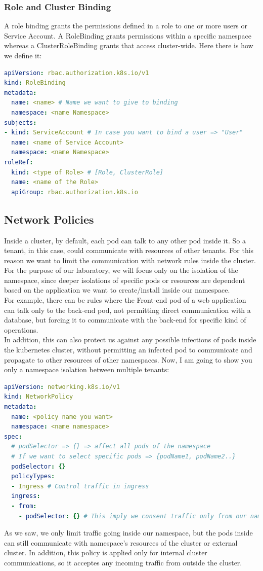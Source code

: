 \subsubsection{Role and Cluster Binding}
A role binding grants the permissions defined in a role to one or more users or Service Account. A RoleBinding grants permissions within a specific namespace whereas a ClusterRoleBinding grants that access cluster-wide. Here there is how we define it:
\begin{lstlisting}[language=yaml, caption={RoleBinding creation}]
apiVersion: rbac.authorization.k8s.io/v1
kind: RoleBinding
metadata:
  name: <name> # Name we want to give to binding
  namespace: <name Namespace>
subjects:
- kind: ServiceAccount # In case you want to bind a user => "User"
  name: <name of Service Account>
  namespace: <name Namespace>
roleRef:
  kind: <type of Role> # [Role, ClusterRole]
  name: <name of the Role>
  apiGroup: rbac.authorization.k8s.io
\end{lstlisting}


\subsection{Network Policies}
\label{subsec:network policies}
Inside a cluster, by default, each pod can talk to any other pod inside it. So a tenant, in this case, could communicate with resources of other tenants. For this reason we want to limit the communication with network rules inside the cluster. For the purpose of our laboratory, we will focus only on the isolation of the namespace, since deeper isolations of specific pods or resources are dependent based on the application we want to create/install inside our namespace. \\
For example, there can be rules where the Front-end pod of a web application can talk only to the back-end pod, not permitting direct communication with a database, but forcing it to communicate with the back-end for specific kind of operations. \\
In addition, this can also protect us against any possible infections of pods inside the kubernetes cluster, without permitting an infected pod to communicate and propagate to other resources of other namespaces. Now, I am going to show you only a namespace isolation between multiple tenants:
\begin{lstlisting}[language=yaml, caption={Network policy setup}]
apiVersion: networking.k8s.io/v1
kind: NetworkPolicy
metadata:
  name: <policy name you want>
  namespace: <name namespace>
spec:
  # podSelector => {} => affect all pods of the namespace
  # If we want to select specific pods => {podName1, podName2..}
  podSelector: {}
  policyTypes:
  - Ingress # Control traffic in ingress
  ingress:
  - from:
    - podSelector: {} # This imply we consent traffic only from our namespace
\end{lstlisting}
As we saw, we only limit traffic going inside our namespace, but the pods inside can still communicate with namespace's resources of the cluster or external cluster. In addition, this policy is applied only for internal cluster communications, so it acceptes any incoming traffic from outside the cluster.